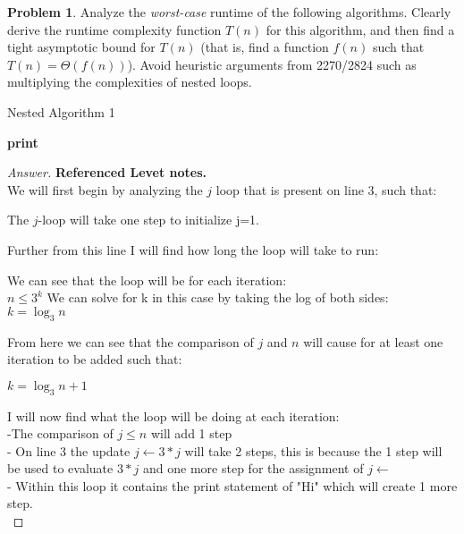 \documentclass[11pt]{article}
\theoremstyle{definition}
\theoremstyle{definition}
\newtheorem{required}{Problem}
\theoremstyle{definition}
\begin{document}
\begin{required}


Analyze the \textit{worst-case} runtime of the following algorithms. Clearly derive the runtime complexity function $T(n)$ for this algorithm, and then find a tight asymptotic bound for $T(n)$ (that is, find a function $f(n)$ such that $T(n) = \Theta(f(n))$). Avoid heuristic arguments from 2270/2824 such as multiplying the complexities of nested loops.



\begin{algorithm}
\caption{Nested Algorithm 1}\label{alg:Nested2}
\begin{algorithmic}[1]
		\State \textbf{print} 
	\EndFor
\EndFor
\EndProcedure
\end{algorithmic}
\end{algorithm}
\begin{proof}[Answer] \textbf{Referenced Levet notes.} \\
We will first begin by analyzing the $j$ loop that is present on line 3, such that: \\
\begin{center}
The $j$-loop will take one step to initialize j=1.
\end{center}
Further from this line I will find how long the loop will take to run: \\
\begin{center}
We can see that the loop will be for each iteration: \\
$n \leq 3^{k}$
We can solve for k in this case by taking the log of both sides: \\
$k = \log_3 n$
\end{center}
From here we can see that the comparison of $j$ and $n$ will cause for at least one iteration to be added such that: \\
\begin{center}
$k = \log_3 n + 1$
\end{center}
I will now find what the loop will be doing at each iteration: \\
\indent -The comparison of $j\leq n$ will add 1 step \\
\indent - On line 3 the update $j \leftarrow 3 * j$ will take 2 steps, this is because the 1 step will be used to evaluate $3 * j$ and \indent one more step for the assignment of $j \leftarrow$ \\
\indent - Within this loop it contains the print statement of "Hi" which will create 1 more step. \\


\end{proof}
\end{required}
\end{document}

